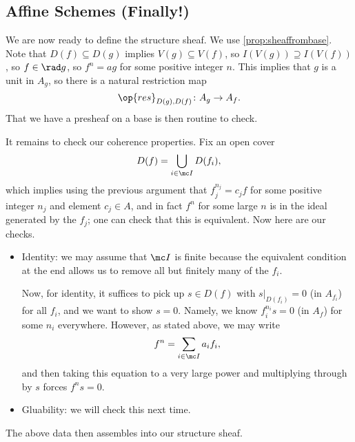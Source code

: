 \documentclass[../notes.tex]{subfiles}
\begin{document}
\subsection{Affine Schemes (Finally!)}
We are now ready to define the structure sheaf.  We use \autoref{prop:sheaffrombase}. Note that $D(f)\subseteq D(g)$ implies $V(g)\subseteq V(f)$, so $I(V(g))\supseteq I(V(f))$, so $f\in\rad g$, so $f^n=ag$ for some positive integer $n$. This implies that $g$ is a unit in $A_g$, so there is a natural restriction map
\[\op{res}_{D(g),D(f)}\colon A_g\to A_f.\]
That we have a presheaf on a base is then routine to check.

It remains to check our coherence properties. Fix an open cover
\[D(f)=\bigcup_{i\in\mc I}D(f_i),\]
which implies using the previous argument that $f_j^{n_j}=c_jf$ for some positive integer $n_j$ and element $c_j\in A$, and in fact $f^n$ for some large $n$ is in the ideal generated by the $f_j$; one can check that this is equivalent. Now here are our checks.
\begin{itemize}
	\item Identity: we may assume that $\mc I$ is finite because the equivalent condition at the end allows us to remove all but finitely many of the $f_i$.

	Now, for identity, it suffices to pick up $s\in D(f)$ with $s|_{D(f_i)}=0$ (in $A_{f_i}$) for all $f_i$, and we want to show $s=0$. Namely, we know $f_i^{n_i}s=0$ (in $A_f$) for some $n_i$ everywhere. However, as stated above, we may write
	\[f^n=\sum_{i\in\mc I}a_if_i,\]
	and then taking this equation to a very large power and multiplying through by $s$ forces $f^ns=0$.
	\item Gluability: we will check this next time.
\end{itemize}
The above data then assembles into our structure sheaf.
\end{document}
